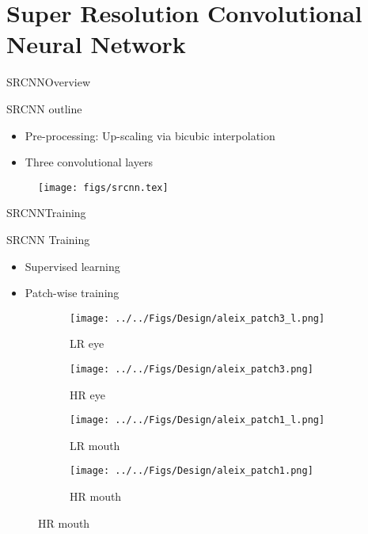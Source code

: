 
\section{Super Resolution Convolutional Neural Network}
\begin{frame}{SRCNN}{Overview}
    \begin{block}{SRCNN outline}
    \begin{itemize}
        \item Pre-processing: Up-scaling via bicubic interpolation
        \item Three convolutional layers
    \end{itemize}
        \begin{figure}
            \texttt{[image: figs/srcnn.tex]}
        \end{figure}
    \end{block}
\end{frame}

\begin{frame}{SRCNN}{Training}
    \begin{block}{SRCNN Training}
        \begin{itemize}
            \item Supervised learning
            \item Patch-wise training
        \end{itemize}

\begin{figure}[H]
\centering
    \begin{subfigure}[b]{0.20\textwidth}
        \centering
        \texttt{[image: ../../Figs/Design/aleix\_patch3\_l.png]}
        \caption{\scriptsize LR eye}
    \end{subfigure}
    \quad
    \begin{subfigure}[b]{0.20\textwidth}
        \centering
        \texttt{[image: ../../Figs/Design/aleix\_patch3.png]}
        \caption{\scriptsize HR eye}
    \end{subfigure}
    \quad
    \begin{subfigure}[b]{0.20\textwidth}
        \centering
        \texttt{[image: ../../Figs/Design/aleix\_patch1\_l.png]}
        \caption{\scriptsize LR mouth}
    \end{subfigure}
    \quad
    \begin{subfigure}[b]{0.20\textwidth}
        \centering
        \texttt{[image: ../../Figs/Design/aleix\_patch1.png]}
        \caption{\scriptsize HR mouth}
    \end{subfigure}
\end{figure}
    \end{block}
\end{frame}


